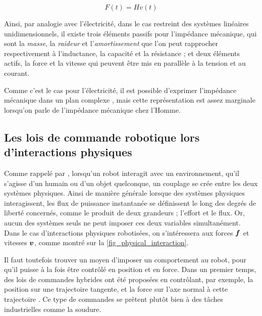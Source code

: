 \begin{equation}
	F(t) = H v(t)
	\label{eq_impedance_mec}
\end{equation}

Ainsi, par analogie avec l'électricité, dans le cas restreint des systèmes linéaires unidimensionnels, il existe trois éléments passifs pour l'impédance mécanique, qui sont la \emph{masse}, la \emph{raideur} et l'\emph{amortissement} que l'on peut rapprocher respectivement à l'inductance, la capacité et la résistance ; et deux éléments actifs, la force et la vitesse qui peuvent être mis en parallèle à la tension et au courant. 

Comme c'est le cas pour l'électricité, il est possible d'exprimer l'impédance mécanique dans un plan complexe \parencite{hondori_method_2009}, mais cette représentation est assez marginale lorsqu'on parle de l'impédance mécanique chez l'Homme.

\subsection{Les lois de commande robotique lors d'interactions physiques} \label{chap1_sec_rob_collab_subsec_ctrl}

Comme rappelé par \parencite{hogan_impedance_1985}, lorsqu'un robot interagit avec un environnement, qu'il s'agisse d'un humain ou d'un objet quelconque, un couplage se crée entre les deux systèmes physiques. Ainsi de manière générale lorsque des systèmes physiques interagissent, les flux de puissance instantanée se définissent le long des degrés de liberté concernés, comme le produit de deux grandeurs ; l'effort et le flux. Or, aucun des systèmes seuls ne peut imposer ces deux variables simultanément. Dans le cas d'interactions physiques robotisées, on s'intéressera aux forces $\vect{f}$ et vitesses $\vect{v}$, comme montré sur la \cref{fig_physical_interaction}.

\tikzexternalenable


Il faut toutefois trouver un moyen d'imposer un comportement au robot, pour qu'il puisse à la fois être contrôlé en position et en force. Dans un premier temps, des lois de commandes hybrides ont été proposées en contrôlant, par exemple, la position sur une trajectoire tangente, et la force sur l'axe normal à cette trajectoire \parencite{raibert_hybrid_1981}. Ce type de commandes se prêtent plutôt bien à des tâches industrielles comme la soudure.


